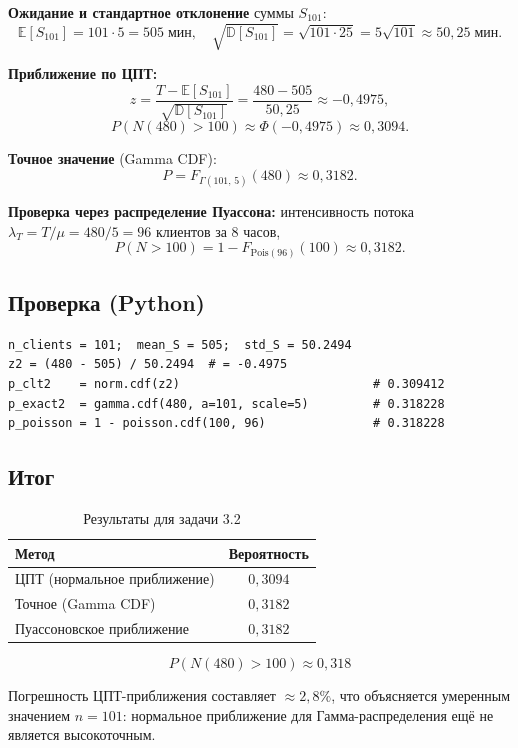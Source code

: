 \documentclass[a4paper,14pt]{article}
\begin{document}
\textbf{Ожидание и стандартное отклонение} суммы $S_{101}$:
\[
    \mathbb{E}[S_{101}] = 101 \cdot 5 = 505\;\text{мин},
    \quad
    \sqrt{\mathbb{D}[S_{101}]} = \sqrt{101 \cdot 25} = 5\sqrt{101} \approx 50{,}25\;\text{мин}.
\]

\textbf{Приближение по ЦПТ:}
\[
    z = \frac{T - \mathbb{E}[S_{101}]}{\sqrt{\mathbb{D}[S_{101}]}}
      = \frac{480 - 505}{50{,}25} \approx -0{,}4975,
\]
\[
    P(N(480) > 100) \approx \Phi(-0{,}4975) \approx 0{,}3094.
\]

\textbf{Точное значение} (Gamma CDF):
\[
    P = F_{\Gamma(101,\,5)}(480) \approx 0{,}3182.
\]

\textbf{Проверка через распределение Пуассона:}
интенсивность потока $\lambda_T = T/\mu = 480/5 = 96$ клиентов за 8 часов,
\[
    P(N > 100) = 1 - F_{\mathrm{Pois}(96)}(100) \approx 0{,}3182.
\]

\subsection*{Проверка (Python)}

\begin{verbatim}
n_clients = 101;  mean_S = 505;  std_S = 50.2494
z2 = (480 - 505) / 50.2494  # = -0.4975
p_clt2    = norm.cdf(z2)                           # 0.309412
p_exact2  = gamma.cdf(480, a=101, scale=5)         # 0.318228
p_poisson = 1 - poisson.cdf(100, 96)               # 0.318228
\end{verbatim}

\subsection*{Итог}

\begin{table}[H]
\centering
\caption{Результаты для задачи 3.2}
\begin{tabular}{|l|c|}
\hline
\textbf{Метод} & \textbf{Вероятность} \\
\hline
ЦПТ (нормальное приближение) & $0{,}3094$ \\
Точное (Gamma CDF)            & $0{,}3182$ \\
Пуассоновское приближение     & $0{,}3182$ \\
\hline
\end{tabular}
\end{table}

\[
    \boxed{P(N(480) > 100) \approx 0{,}318}
\]

Погрешность ЦПТ-приближения составляет $\approx 2{,}8\%$, что объясняется умеренным значением $n = 101$: нормальное приближение для Гамма-распределения ещё не является высокоточным.
\end{document}
